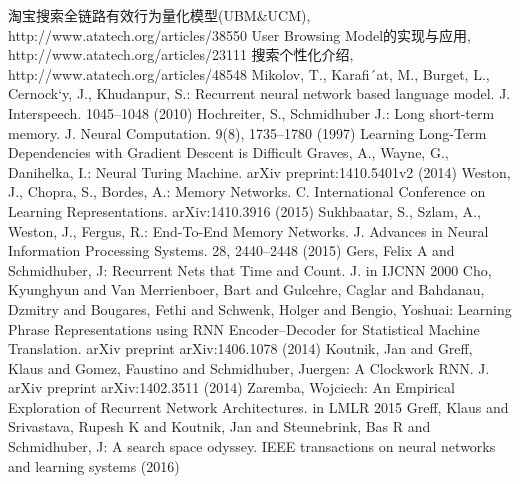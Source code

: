 \begin{thebibliography}{99}
 淘宝搜索全链路有效行为量化模型(UBM\&UCM), http://www.atatech.org/articles/38550
 User Browsing Model的实现与应用, http://www.atatech.org/articles/23111
 搜索个性化介绍, http://www.atatech.org/articles/48548
 Mikolov, T., Karafi´at, M., Burget, L., Cernock`y, J., Khudanpur, S.: Recurrent neural network based language model. J. Interspeech. 1045–1048 (2010)
  Hochreiter, S., Schmidhuber J.: Long short-term memory. J. Neural Computation. 9(8), 1735–1780 (1997)
 Learning Long-Term Dependencies with Gradient Descent is Difficult
 Graves, A., Wayne, G., Danihelka, I.: Neural Turing Machine. arXiv preprint:1410.5401v2 (2014)
 Weston, J., Chopra, S., Bordes, A.: Memory Networks. C. International Conference on Learning Representations. arXiv:1410.3916 (2015)
 Sukhbaatar, S., Szlam, A., Weston, J., Fergus, R.: End-To-End Memory Networks. J. Advances in Neural Information Processing Systems. 28, 2440–2448 (2015)
 Gers, Felix A and Schmidhuber, J: Recurrent Nets that Time and Count. J. in IJCNN 2000
 Cho, Kyunghyun and Van Merrienboer, Bart and Gulcehre, Caglar and Bahdanau, Dzmitry and Bougares, Fethi and Schwenk, Holger and Bengio, Yoshuai: Learning Phrase Representations using RNN Encoder–Decoder for Statistical Machine Translation. arXiv preprint arXiv:1406.1078 (2014)
 Koutnik, Jan and Greff, Klaus and Gomez, Faustino and Schmidhuber, Juergen: A Clockwork RNN. J. arXiv preprint arXiv:1402.3511 (2014)
 Zaremba, Wojciech: An Empirical Exploration of Recurrent Network Architectures. in LMLR 2015
 Greff, Klaus and Srivastava, Rupesh K and Koutnik, Jan and Steunebrink, Bas R and Schmidhuber, J: A search space odyssey. IEEE transactions on neural networks and learning systems (2016)
\end{thebibliography}

 
